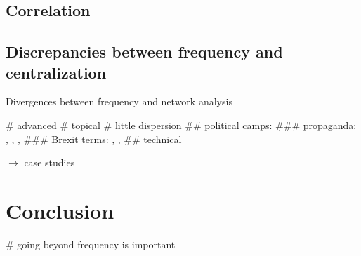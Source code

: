 \documentclass[a4paper]{scrartcl}
\begin{document}
  \subsection{Correlation}

  \subsection{Discrepancies between frequency and centralization}

    Divergences between frequency and network analysis

      \begin{easylist}[itemize]
        # advanced
        # topical
        # little dispersion
          ## political camps:
            ### propaganda: , , , 
            ### Brexit terms: , , 
          ## technical
      \end{easylist}

    $\rightarrow$ case studies

\section{Conclusion}

  \begin{easylist}[itemize]
    # going beyond frequency is important
  \end{easylist}


  \printbibliography
\end{document}
